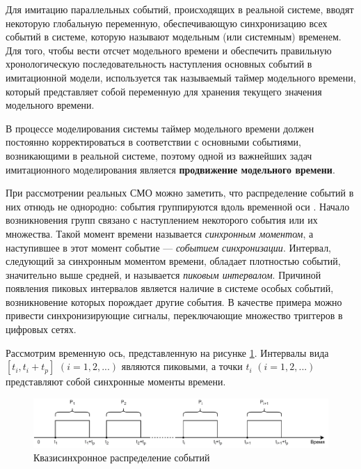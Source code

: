 

Для имитацию параллельных событий, происходящих в реальной системе, вводят некоторую глобальную переменную, обеспечивающую синхронизацию всех событий в системе, которую называют модельным (или системным) временем. Для того, чтобы вести отсчет модельного времени и обеспечить правильную хронологическую последовательность наступления основных событий в имитационной модели, используется так называемый таймер модельного времени, который представляет собой переменную для хранения текущего значения модельного времени.

В процессе моделирования системы таймер модельного времени должен постоянно корректироваться в соответствии с основными событиями, возникающими в реальной системе, поэтому одной из важнейших задач имитационного моделирования является \textbf{продвижение модельного времени}.

При рассмотрении реальных СМО можно заметить, что распределение событий в них отнюдь не однородно: события группируются вдоль временной оси \cite{system_modelling}. Начало возникновения групп связано с наступлением некоторого события или их множества. Такой момент времени называется \textit{синхронным моментом}, а наступившее в этот момент событие --- \textit{событием синхронизации}. Интервал, следующий за синхронным моментом времени, обладает плотностью событий, значительно выше средней, и называется \textit{пиковым интервалом}. Причиной появления пиковых интервалов является наличие в системе особых событий, возникновение которых порождает другие события. В качестве примера можно привести синхронизирующие сигналы, переключающие множество триггеров в цифровых сетях.

Рассмотрим временную ось, представленную на рисунке \ref{img:delft_example}. Интервалы вида $[t_i, t_i + t_p]$ $(i = 1, 2, ...)$ являются пиковыми, а точки $t_i$ $(i = 1, 2, ...)$ представляют собой синхронные моменты времени.

\begin{figure}[h!btp]
	\centering
	\includegraphics[width=0.8\columnwidth]{inc/img/delft_example.pdf}
	\caption{Квазисинхронное распределение событий}
	\label{img:delft_example}	
\end{figure}

